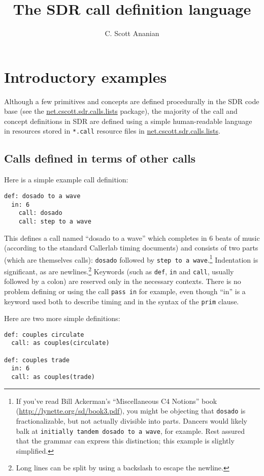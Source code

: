 \documentclass[12pt]{article}
\title{The SDR call definition language}
\author{C. Scott Ananian}
\date{}
\newcommand{\clause}[1]{\texttt{#1}}
\renewcommand{\call}[1]{\texttt{#1}} %
\newcommand{\package}[1]{\url{#1}}
\begin{document}
\maketitle

\section{Introductory examples}

Although a few primitives and concepts are defined procedurally in the
SDR code base (see the \package{net.cscott.sdr.calls.lists}
package), the majority of the call and concept definitions in SDR are
defined using a simple human-readable language in resources stored
in \texttt{*.call} resource files in \package{net.cscott.sdr.calls.lists}.

\subsection{Calls defined in terms of other calls}
Here is a simple example call definition:
\begin{lstlisting}
def: dosado to a wave
  in: 6
    call: dosado
    call: step to a wave
\end{lstlisting}

This defines a call named ``dosado to a wave'' which completes in 6
beats of music (according to the standard Callerlab timing documents)
and consists of two parts (which are themselves calls): \call{dosado}
followed by \call{step to a wave}.\footnote{If you've read Bill
  Ackerman's ``Miscellaneous C4 Notions'' book
  (\url{http://lynette.org/sd/book3.pdf}), you might be objecting that
  \call{dosado} is fractionalizable, but not actually divisible into
  parts.  Dancers would likely balk at \call{initially tandem dosado
    to a wave}, for example.  Rest assured that the grammar can
  express this distinction; this example is slightly simplified.}
Indentation is significant, as are newlines.\footnote{Long lines can
  be split by using a backslash to escape the newline.}
Keywords (such as \clause{def}, \clause{in} and \clause{call}, usually
followed by a colon) are reserved only in the necessary contexts.
There is no problem defining or using the call
\call{pass in} for example, even though ``in'' is a keyword used both
to describe timing and in the syntax of the \clause{prim}  clause.

Here are two more simple definitions:
\begin{lstlisting}
def: couples circulate
  call: as couples(circulate)

def: couples trade
  in: 6
  call: as couples(trade)
\end{lstlisting}
\end{document}

